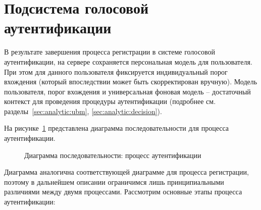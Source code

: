 \section{Подсистема голосовой аутентификации}
\label{sec:construct:verification}

В результате завершения процесса регистрации в системе голосовой аутентификации,
на сервере сохраняется персональная модель для пользователя. При этом для
данного пользователя фиксируется индивидуальный порог вхождения (который
впоследствии может быть скорректирован вручную). Модель пользователя, порог
вхождения и универсальная фоновая модель -- достаточный контекст для проведения
процедуры аутентификации (подробнее см. разделы~\ref{sec:analytic:ubm},
\ref{sec:analytic:decision}).

На рисунке~\ref{fig:seq_verification} представлена диаграмма последовательности
для процесса аутентификации.

\begin{figure}[htp!]
    \center{
        \fontsize{12}{14}\selectfont
        
    }
    \caption{Диаграмма последовательности: процесс аутентификации}
    \label{fig:seq_verification}
\end{figure}

Диаграмма аналогична соответствующей диаграмме для процесса регистрации, поэтому
в дальнейшем описании ограничимся лишь принципиальными различиями между двумя
процессами. Рассмотрим основные этапы процесса аутентификации:

